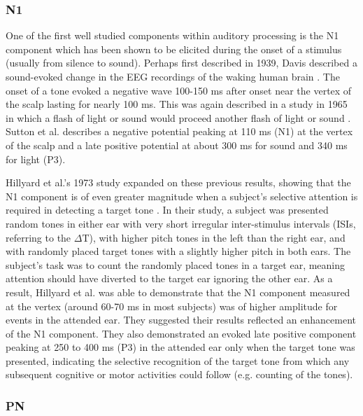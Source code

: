 \subsubsection{N1}

One of the first well studied components within auditory processing is the N1 component which has been shown to be elicited during the onset of a stimulus (usually from silence to sound).  Perhaps first described in 1939, Davis described a sound-evoked change in the EEG recordings of the waking human brain \cite{Davis1939}.  The onset of a tone evoked a negative wave 100-150 ms after onset near the vertex of the scalp lasting for nearly 100 ms.  This was again described in a study in 1965 in which a flash of light or sound would proceed another flash of light or sound \cite{Sutton1965}.  Sutton et al. describes a negative potential peaking at 110 ms (N1) at the vertex of the scalp and a late positive potential at about 300 ms for sound and 340 ms for light (P3).  

Hillyard et al.'s 1973 study expanded on these previous results, showing that the N1 component is of even greater magnitude when a subject's selective attention is required in detecting a target tone \cite{Hillyard1973}.   In their study, a subject was presented random tones in either ear with very short irregular inter-stimulus intervals (ISIs, referring to the $\Delta \text{T}$), with higher pitch tones in the left than the right ear, and with randomly placed target tones with a slightly higher pitch in both ears.  The subject's task was to count the randomly placed tones in a target ear, meaning attention should have diverted to the target ear ignoring the other ear.  As a result, Hillyard et al. was able to demonstrate that the N1 component measured at the vertex (around 60-70 ms in most subjects) was of higher amplitude for events in the attended ear.  They suggested their results reflected an enhancement of the N1 component.  They also demonstrated an evoked late positive component peaking at 250 to 400 ms (P3) in the attended ear only when the target tone was presented, indicating the selective recognition of the target tone from which any subsequent cognitive or motor activities could follow (e.g. counting of the tones). 

\subsubsection{PN}

